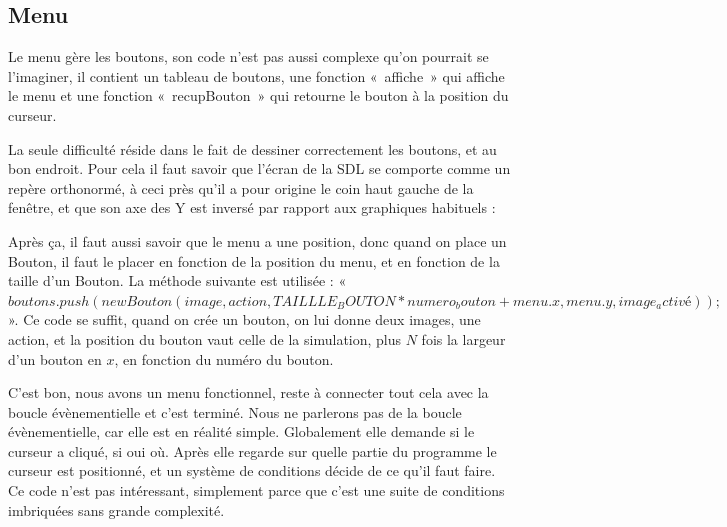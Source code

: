 \subsection{Menu}
	Le menu gère les boutons, son code n'est pas aussi complexe qu'on pourrait se l'imaginer, il contient un tableau de boutons, une fonction «~affiche~» qui affiche le menu et une fonction «~recupBouton~» qui retourne le bouton à la position du curseur.
	
	La seule difficulté réside dans le fait de dessiner correctement les boutons, et au bon endroit. Pour cela il faut savoir que l'écran de la SDL se comporte comme un repère orthonormé, à ceci près qu'il a pour origine le coin haut gauche de la fenêtre, et que son axe des Y est inversé par rapport aux graphiques habituels : 
	
	Après ça, il faut aussi savoir que le menu a une position, donc quand on place un Bouton, il faut le placer en fonction de la position du menu, et en fonction de la taille d'un Bouton. La méthode suivante est utilisée : 
	« $boutons.push(new Bouton (image,action, TAILLLE_BOUTON * numero_bouton + menu.x , menu.y,image_activé));$ ». Ce code se suffit, quand on crée un bouton, on lui donne deux images, une action, et la position du bouton vaut celle de la simulation, plus $N$ fois la largeur d'un bouton en $x$, en fonction du numéro du bouton.
	
	C'est bon, nous avons un menu fonctionnel, reste à connecter tout cela avec la boucle évènementielle et c'est terminé. Nous ne parlerons pas de la boucle évènementielle, car elle est en réalité simple. Globalement elle demande si le curseur a cliqué, si oui où. Après elle regarde sur quelle partie du programme le curseur est positionné, et un système de conditions décide de ce qu'il faut faire. Ce code n'est pas intéressant, simplement parce que c'est une suite de conditions imbriquées sans grande complexité.
